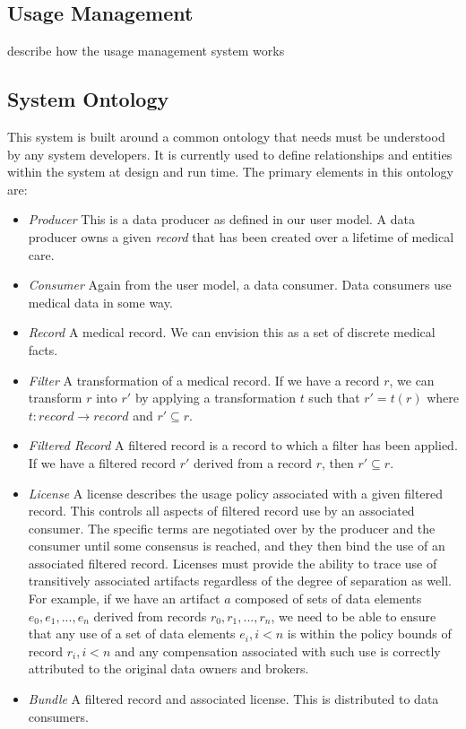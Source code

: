 \documentclass[10pt, conference, compsocconf]{IEEEtran}
\begin{document}
\subsection{Usage Management}
describe how the usage management system works

\subsection{System Ontology}
This system is built around a common ontology that needs must be understood by any system developers.  It is currently used to define relationships and entities within the system at design and run time.  The primary elements in this ontology are:
\begin{itemize}
\item \textit{Producer} This is a data producer as defined in our user model.  A data producer owns a given \textit{record} that has been created over a lifetime of medical care.
\item \textit{Consumer} Again from the user model, a data consumer.  Data consumers use medical data in some way.
\item \textit{Record} A medical record.  We can envision this as a set of discrete medical facts.
\item \textit{Filter} A transformation of a medical record.  If we have a record $ r $, we can transform $ r $ into $ r' $ by applying a transformation $ t $ such that $ r' = t(r) $ where $ t : record \rightarrow record $ and $ r' \subseteq r $.
\item \textit{Filtered Record} A filtered record is a record to which a filter has been applied.  If we have a filtered record $ r' $ derived from a record $ r $, then $ r' \subseteq r $.
\item \textit{License} A license describes the usage policy associated with a given filtered record.  This controls all aspects of filtered record use by an associated consumer.  The specific terms are negotiated over by the producer and the consumer until some consensus is reached, and they then bind the use of an associated filtered record.  Licenses must provide the ability to trace use of transitively associated artifacts regardless of the degree of separation as well.  For example, if we have an artifact $ a $ composed of sets of data elements $ e_{0}, e_{1}, ... , e_{n} $ derived from records $ r_{0}, r_{1}, ... , r_{n} $, we need to be able to ensure that any use of a set of data elements $ e_{i}, i < n $ is within the policy bounds of record $ r_{i}, i < n $ and any compensation associated with such use is correctly attributed to the original data owners and brokers.
\item \textit{Bundle} A filtered record and associated license.  This is distributed to data consumers.
\end{itemize}
\end{document}
